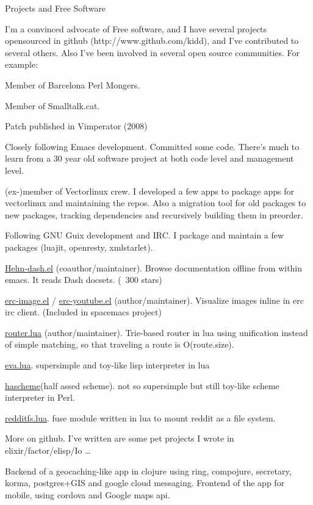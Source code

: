 \documentclass{resume} %
\begin{document}
\begin{rSection}{Projects and Free Software}

  I'm a convinced advocate of Free software, and I have several
  projects opensourced in github (http://www.github.com/kidd), and
  I've contributed to several others. Also I've been involved in
  several open source communities. For example:

\item Member of Barcelona Perl Mongers.
\item Member of Smalltalk.cat.
\item Patch published in Vimperator (2008)
\item Closely following Emacs development. Committed some code. There's
  much to learn from a 30 year old software project at both code level
  and management level.
\item (ex-)member of Vectorlinux crew. I developed a few apps to
  package apps for vectorlinux and maintaining the repos. Also a
  migration tool for old packages to new packages, tracking
  dependencies and recursively building them in preorder.
\item Following GNU Guix development and IRC.  I package and maintain
  a few packages (luajit, openresty, xmlstarlet).
\item \href{https://github.com/areina/helm-dash}{Helm-dash.el}
  (coauthor/maintainer). Browse documentation offline from within
  emacs. It reads Dash docsets. (~300 stars)
\item
  \href{https://github.com/kidd/erc-image.el}{erc-image.el} /
  \href{https://github.com/kidd/erc-youtube.el}{erc-youtube.el}
  (author/maintainer). Visualize images inline in erc irc
  client. (Included in spacemacs project)
\item \href{https://github.com/apitools/router.lua}{router.lua}
  (author/maintainer). Trie-based router in lua using unification
  instead of simple matching, so that traveling a route is
  O(route.size).
\item \href{https://github.com/kidd/eva}{eva.lua}. supersimple and
  toy-like lisp interpreter in lua
\item \href{https://github.com/kidd/hascheme}{hascheme}(half assed
  scheme). not so supersimple but still toy-like scheme interpreter in
  Perl.
\item \href{https://github.com/kidd/redditfs.lua}{redditfs.lua}. fuse
  module written in lua to mount reddit as a file system.
\item More on github. I've written are some pet projects I wrote in
  elixir/factor/elisp/Io \ldots
\item Backend of a geocaching-like app in clojure using ring,
  compojure, secretary, korma, postgres+GIS and google cloud
  messaging. Frontend of the app for mobile, using cordova and Google
  maps api.
\end{rSection}
\end{document}

